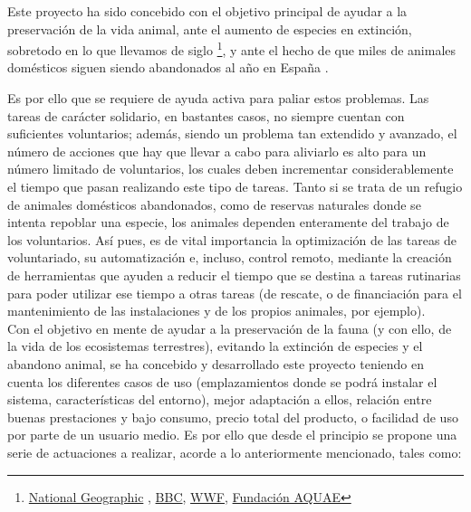 \documentclass[12pt]{article}
\begin{document}
	\noindent Este proyecto ha sido concebido con el objetivo principal de ayudar a la preservación de la vida animal, ante el aumento de especies en extinción, sobretodo en lo que llevamos de siglo \footnote{\href{https://www.nationalgeographic.com.es/naturaleza/grandes-reportajes/animales-peligro-extincion_12536}{National Geographic} , \href{https://www.bbc.com/mundo/noticias-54036796}{BBC}, \href{https://www.worldwildlife.org/descubre-wwf/historias/que-significa-especie-en-peligro-de-extincion}{WWF}, \href{https://www.fundacionaquae.org/causas-perdida-biodiversidad/}{Fundación AQUAE}}, y ante el hecho de que miles de animales domésticos siguen siendo abandonados al año en España \footnotemark. \\
	

	\noindent Es por ello que se requiere de ayuda activa para paliar estos problemas. Las tareas de carácter solidario, en bastantes casos, no siempre cuentan con suficientes voluntarios; además, siendo un problema tan extendido y avanzado, el número de acciones que hay que llevar a cabo para aliviarlo es alto para un número limitado de voluntarios, los cuales deben incrementar considerablemente el tiempo que pasan realizando este tipo de tareas. 
	Tanto si se trata de un refugio de animales domésticos abandonados, como de reservas naturales donde se intenta repoblar una especie, los animales dependen enteramente del trabajo de los voluntarios. Así pues, es de vital importancia la optimización de las tareas de voluntariado, su automatización e, incluso, control remoto, mediante la creación de herramientas que ayuden a reducir el tiempo que se destina a tareas rutinarias para poder utilizar ese tiempo a otras tareas (de rescate, o de financiación para el mantenimiento de las instalaciones y de los propios animales, por ejemplo). \\
	
	\noindent Con el objetivo en mente de ayudar a la preservación de la fauna (y con ello, de la vida de los ecosistemas terrestres), evitando la extinción de especies y el abandono animal, se ha concebido y desarrollado este proyecto teniendo en cuenta los diferentes casos de uso (emplazamientos donde se podrá instalar el sistema, características del entorno), mejor adaptación a ellos, relación entre buenas prestaciones y bajo consumo, precio total del producto, o facilidad de uso por parte de un usuario medio. Es por ello que desde el principio se propone una serie de actuaciones a realizar, acorde a lo anteriormente mencionado, tales como:
	
\end{document}
